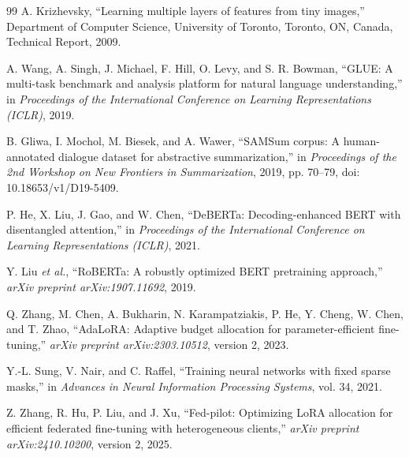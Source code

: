 \documentclass[10pt,conference,letterpaper]{IEEEtran}
\begin{document}
\begin{thebibliography}{99}
A. Krizhevsky,
``Learning multiple layers of features from tiny images,''
Department of Computer Science, University of Toronto, Toronto, ON, Canada, Technical Report, 2009.

A. Wang, A. Singh, J. Michael, F. Hill, O. Levy, and S. R. Bowman,
``GLUE: A multi-task benchmark and analysis platform for natural language understanding,''
in \emph{Proceedings of the International Conference on Learning Representations (ICLR)}, 2019.

B. Gliwa, I. Mochol, M. Biesek, and A. Wawer,
``SAMSum corpus: A human-annotated dialogue dataset for abstractive summarization,''
in \emph{Proceedings of the 2nd Workshop on New Frontiers in Summarization}, 2019, pp. 70--79,
doi: 10.18653/v1/D19-5409.

P. He, X. Liu, J. Gao, and W. Chen,
``DeBERTa: Decoding-enhanced BERT with disentangled attention,''
in \emph{Proceedings of the International Conference on Learning Representations (ICLR)}, 2021.

Y. Liu \emph{et al.},
``RoBERTa: A robustly optimized BERT pretraining approach,''
\emph{arXiv preprint arXiv:1907.11692}, 2019.

Q. Zhang, M. Chen, A. Bukharin, N. Karampatziakis, P. He, Y. Cheng, W. Chen, and T. Zhao,
``AdaLoRA: Adaptive budget allocation for parameter-efficient fine-tuning,''
\emph{arXiv preprint arXiv:2303.10512}, version 2, 2023.

Y.-L. Sung, V. Nair, and C. Raffel,
``Training neural networks with fixed sparse masks,''
in \emph{Advances in Neural Information Processing Systems}, vol. 34, 2021.

Z. Zhang, R. Hu, P. Liu, and J. Xu,
``Fed-pilot: Optimizing LoRA allocation for efficient federated fine-tuning with heterogeneous clients,''
\emph{arXiv preprint arXiv:2410.10200}, version 2, 2025.
\end{thebibliography}
\end{document}

